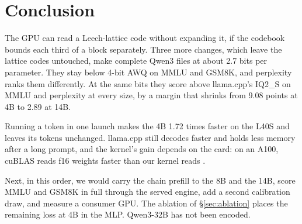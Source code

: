 \section{Conclusion}
\label{sec:conclusion}

The GPU can read a Leech-lattice code without expanding it, if the codebook
bounds each third of a block separately. Three more changes, which leave the
lattice codes untouched, make complete Qwen3 files at about 2.7 bits per
parameter. They stay below 4-bit AWQ on MMLU and GSM8K, and perplexity ranks
them differently. At the same bits they score above llama.cpp's IQ2\_S on
MMLU and perplexity at every size, by a margin that shrinks from 9.08 points
at 4B to 2.89 at 14B.

Running a token in one launch makes the 4B 1.72 times faster on the L40S and
leaves its tokens unchanged. llama.cpp still decodes faster and holds less
memory after a long prompt, and the kernel's gain depends on the card: on an
A100, cuBLAS reads f16 weights faster than our kernel reads \Tetra{}.

Next, in this order, we would carry the chain prefill to the 8B and the 14B,
score MMLU and GSM8K in full through the served engine, add a second
calibration draw, and measure a consumer GPU. The ablation of
\S\ref{sec:ablation} places the remaining loss at 4B in the MLP. Qwen3-32B
has not been encoded.
